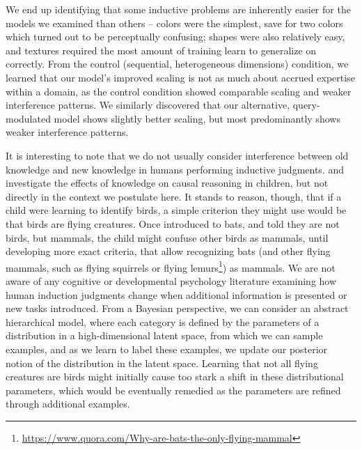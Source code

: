 We end up identifying that some inductive problems are inherently easier for the models we examined than others -- colors were the simplest, save for two colors which turned out to be perceptually confusing; shapes were also relatively easy, and textures required the most amount of training learn to generalize on correctly. From the control (sequential, heterogeneous dimensions) condition, we learned that our model’s improved scaling is not as much about accrued expertise within a domain, as the control condition showed comparable scaling and weaker interference patterns. We similarly discovered that our alternative, query-modulated model shows slightly better scaling, but most predominantly shows weaker interference patterns. 

It is interesting to note that we do not usually consider interference between old knowledge and new knowledge in humans performing inductive judgments. \textcite{Gopnik} and \textcite{Griffiths2011} investigate the effects of knowledge on causal reasoning in children, but not directly in the context we postulate here. It stands to reason, though, that if a child were learning to identify birds, a simple criterion they might use would be that birds are flying creatures. Once introduced to bats, and told they are not birds, but mammals, the child might confuse other birds as mammals, until developing more exact criteria, that allow recognizing bats (and other flying mammals, such as flying squirrels or flying lemurs\footnote{\url{https://www.quora.com/Why-are-bats-the-only-flying-mammal}}) as mammals. We are not aware of any cognitive or developmental psychology literature examining how human induction judgments change when additional information is presented or new tasks introduced. From a Bayesian perspective, we can consider an abstract hierarchical model, where each category is defined by the parameters of a distribution in a high-dimensional latent space, from which we can sample examples, and as we learn to label these examples, we update our posterior notion of the distribution in the latent space. Learning that not all flying creatures are birds might initially cause too stark a shift in these distributional parameters, which would be eventually remedied as the parameters are refined through additional examples. 

